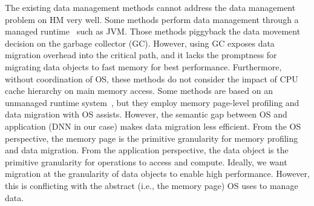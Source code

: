\textcolor{check}{The existing data management methods cannot address the data management problem on HM very well. Some methods perform data management through a managed runtime~\cite{pldi19:panthera, pldi18:KG,ASPLOS18:Espresso,sigmetrics19:crystalgazer} such as JVM. Those methods piggyback the data movement decision on the garbage collector (GC). However, using GC exposes data migration overhead into the critical path, and it lacks the promptness for migrating data objects to fast memory for best performance. Furthermore, without coordination of OS, these methods do not consider the impact of CPU cache hierarchy on main memory access. 
Some methods are based on an unmanaged runtime system~\cite{Thermostat:asplos17,RAMinate:socc16,heteros:isca17,unimem:sc17,sc18:wu,Yan:ASPLOS19}, but they employ memory page-level profiling and data migration with OS assists. However, the semantic gap between OS and application (DNN in our case) makes data migration less efficient. From the OS perspective, the memory page is the primitive granularity for memory profiling and data migration. From the application perspective, the data object is the primitive granularity for operations to access and compute. Ideally, we want migration at the granularity of data objects to enable high performance. However, this is conflicting with the abstract (i.e., the memory page) OS uses to manage data. %
}


